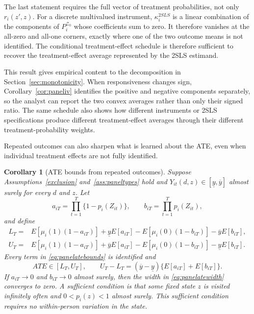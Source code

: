 \documentclass[11pt]{article}
\newtheorem{corollary}{Corollary}
\newcommand{\1}{\mathbf{1}}
\begin{document}
The last statement requires the full vector of treatment probabilities, not
only $r_i(z',z)$. For a discrete multivalued instrument,
$\kappa_i^{2SLS}$ is a linear combination of the components of
$P_i^{\mathcal Z_0}$ whose coefficients sum to zero. It therefore vanishes at
the all-zero and all-one corners, exactly where one of the two outcome means is
not identified. The conditional treatment-effect schedule is therefore
sufficient to recover the treatment-effect average represented by the 2SLS
estimand.

This result gives empirical content to the decomposition in
Section~\ref{sec:monotonicity}. When responsiveness changes sign,
Corollary~\ref{cor:paneliv} identifies the positive and negative components
separately, so the analyst can report the two convex averages rather than only
their signed ratio. The same schedule also shows how different instruments or
2SLS specifications produce different treatment-effect averages through their
different treatment-probability weights.

Repeated outcomes can also sharpen what is learned about the ATE, even when
individual treatment effects are not fully identified.

\begin{corollary}[ATE bounds from repeated outcomes]
\label{cor:panelate}
Suppose Assumptions~\ref{exclusion} and~\ref{ass:paneltypes} hold and
$Y_{it}(d,z)\in[\underline y,\overline y]$ almost surely for every $d$ and
$z$. Let
\[
a_{iT}=\prod_{t=1}^{T}\{1-p_i(Z_{it})\},
\qquad
b_{iT}=\prod_{t=1}^{T}p_i(Z_{it}),
\]
and define
\begin{align}
L_T={}&E[\mu_i(1)(1-a_{iT})]+\underline yE[a_{iT}]
      -E[\mu_i(0)(1-b_{iT})]-\overline yE[b_{iT}], \nonumber\\
U_T={}&E[\mu_i(1)(1-a_{iT})]+\overline yE[a_{iT}]
      -E[\mu_i(0)(1-b_{iT})]-\underline yE[b_{iT}].
\label{eq:panelatebounds}
\end{align}
Every term in \eqref{eq:panelatebounds} is identified and
\begin{equation}
ATE\in[L_T,U_T],
\qquad
U_T-L_T=(\overline y-\underline y)\{E[a_{iT}]+E[b_{iT}]\}.
\label{eq:panelatewidth}
\end{equation}
If $a_{iT}\to0$ and $b_{iT}\to0$ almost surely, then the width in
\eqref{eq:panelatewidth} converges to zero. A sufficient condition is that
some fixed state $z$ is visited infinitely often and $0<p_i(z)<1$ almost
surely. This sufficient condition requires no within-person variation in the
state.
\end{corollary}
\end{document}
